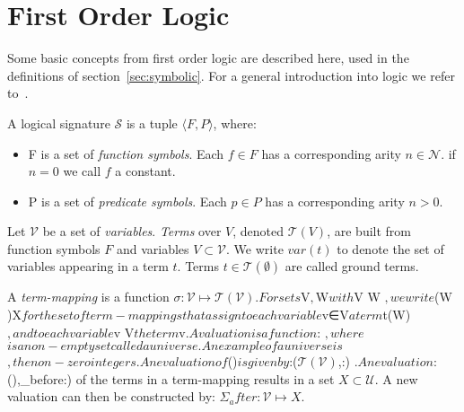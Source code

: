 \section{First Order Logic}\label{sec:first_order_logic}

Some basic concepts from first order logic are described here, used in the definitions of section~\ref{sec:symbolic}. For a general introduction into logic we refer to~\cite{Huth:logic}.

\begin{definition}
A logical signature $\mathcal{S}$ is a tuple $\langle F, P \rangle$, where:
\begin{itemize}
 \item F is a set of \textit{function symbols}. Each $f\in F$ has a corresponding arity $n\in \mathcal{N}$. if $n = 0$ we call $f$ a constant.
 \item P is a set of \textit{predicate symbols}. Each $p\in P$ has a corresponding arity $n > 0$.
\end{itemize}
\end{definition}
 
Let $\mathcal{V}$ be a set of \textit{variables}. \textit{Terms} over $V$, denoted $\mathcal{T}(V)$, are built from function symbols $F$ and variables $V \subset \mathcal{V}$. We write $var(t)$ to denote the set of variables appearing in a term $t$. Terms $t\in \mathcal{T}(\emptyset)$ are called ground terms.

A \textit{term-mapping} is a function $\sigma:\mathcal{V} \mapsto \mathcal{T}(\mathcal{V}). For sets $V$, $W$ with $V \cup W \subset {}$, we write $(W )X$ for the set of term-mappings that assign to each variable $v∈V$ a term $t\in {}(W)$, and to each variable $v \not\in V$ the term $v$.

A \textit{valuation} $\Sigma$ is a function $\Sigma: \mapsto {}$, where $$ is a non-empty set called a \textit{universe}. An example of a universe is $$, the non-zero integers.

An \textit{evaluation} of $()$ is given by $\epsilon:($\mathcal{T}(\mathcal{V})$,\Sigma:) \mapsto {}$. An evaluation $\epsilon:(),\Sigma_before:) of the terms in a term-mapping results in a set $X \subset \mathcal{U}$. A new valuation can then be constructed by: $\Sigma_after:\mathcal{V} \mapsto X$.
